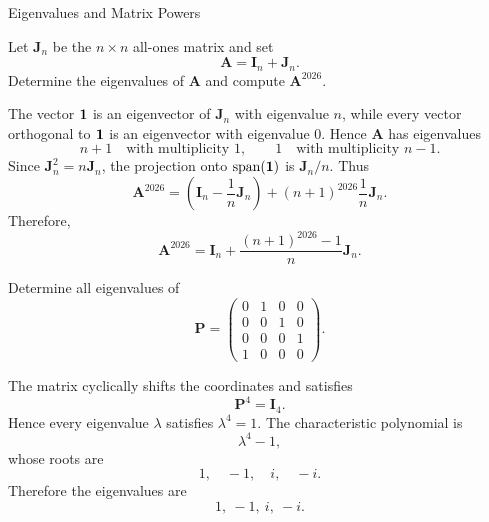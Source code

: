 \begin{expectedproblemgroup}{Eigenvalues and Matrix Powers}
        \begin{expectedsubproblem}
            Let $\mathbf{J}_n$ be the $n\times n$ all-ones matrix and set
            \[
                \mathbf{A}=\mathbf{I}_n+\mathbf{J}_n.
            \]
            Determine the eigenvalues of $\mathbf{A}$ and compute
            $\mathbf{A}^{2026}$.
        \end{expectedsubproblem}

        \begin{expectedsubsolution}
            The vector $\mathbf{1}$ is an eigenvector of $\mathbf{J}_n$ with eigenvalue
            $n$, while every vector orthogonal to $\mathbf{1}$ is an eigenvector with
            eigenvalue $0$. Hence $\mathbf{A}$ has eigenvalues
            \[
                n+1
                \quad\text{with multiplicity }1,
                \qquad
                1
                \quad\text{with multiplicity }n-1.
            \]
            Since $\mathbf{J}_n^2=n\mathbf{J}_n$, the projection onto
            $\operatorname{span}(\mathbf{1})$ is $\mathbf{J}_n/n$. Thus
            \[
                \mathbf{A}^{2026}
                =
                \left(\mathbf{I}_n-\frac{1}{n}\mathbf{J}_n\right)
                +(n+1)^{2026}\frac{1}{n}\mathbf{J}_n.
            \]
            Therefore,
            \[
                \boxed{
                    \mathbf{A}^{2026}
                    =
                    \mathbf{I}_n
                    +
                    \frac{(n+1)^{2026}-1}{n}\mathbf{J}_n
                }.
            \]
        \end{expectedsubsolution}

        \begin{expectedsubproblem}
            Determine all eigenvalues of
            \[
                \mathbf{P}
                =
                \begin{pmatrix}
                    0&1&0&0\\
                    0&0&1&0\\
                    0&0&0&1\\
                    1&0&0&0
                \end{pmatrix}.
            \]
        \end{expectedsubproblem}

        \begin{expectedsubsolution}
            The matrix cyclically shifts the coordinates and satisfies
            \[
                \mathbf{P}^4=\mathbf{I}_4.
            \]
            Hence every eigenvalue $\lambda$ satisfies $\lambda^4=1$. The
            characteristic polynomial is
            \[
                \lambda^4-1,
            \]
            whose roots are
            \[
                1,\quad -1,\quad i,\quad -i.
            \]
            Therefore the eigenvalues are
            \[
                \boxed{1,\ -1,\ i,\ -i}.
            \]
        \end{expectedsubsolution}


\end{expectedproblemgroup}
